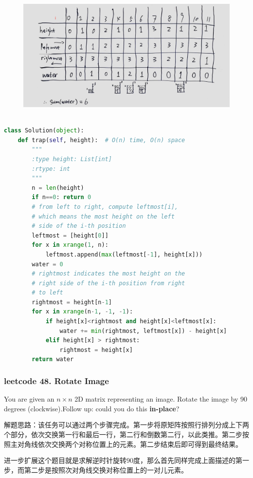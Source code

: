 \documentclass[a4paper,10pt]{article}
\begin{document}
\begin{figure}[h]
    \includegraphics[width=\textwidth]{leetcode42.jpg}
    \centering \\
\end{figure}

\begin{lstlisting}[language=Python, caption=Problem42. Trapping Rain Water]

class Solution(object):
    def trap(self, height):  # O(n) time, O(n) space
        """
        :type height: List[int]
        :rtype: int
        """
        n = len(height)
        if n==0: return 0
        # from left to right, compute leftmost[i],
        # which means the most height on the left
        # side of the i-th position
        leftmost = [height[0]]
        for x in xrange(1, n):
            leftmost.append(max(leftmost[-1], height[x]))
        water = 0
        # rightmost indicates the most height on the
        # right side of the i-th position from right
        # to left
        rightmost = height[n-1]
        for x in xrange(n-1, -1, -1):
            if height[x]<rightmost and height[x]<leftmost[x]:
                water += min(rightmost, leftmost[x]) - height[x]
            elif height[x] > rightmost:
                rightmost = height[x]
        return water
\end{lstlisting}



\subsubsection{leetcode 48. Rotate Image}
You are given an $n \times n$ 2D matrix representing an image. Rotate the image by 90 degrees (clockwise).Follow up: could you do this \textbf{in-place}?\\

\begin{CJK*}{UTF8}{gbsn}
\noindent 解题思路：该任务可以通过两个步骤完成。第一步将原矩阵按照行排列分成上下两个部分，依次交换第一行和最后一行，第二行和倒数第二行，以此类推。第二步按照主对角线依次交换两个对称位置上的元素。第二步结束后即可得到最终结果。

\noindent 进一步扩展这个题目就是求解逆时针旋转90度，那么首先同样完成上面描述的第一步，而第二步是按照次对角线交换对称位置上的一对儿元素。\\
\end{CJK*}
\end{document}
